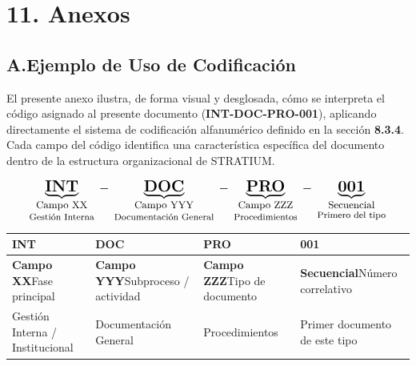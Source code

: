 \documentclass{encabezado}
\begin{document}
\section*{11. Anexos}

\subsection*{A.\enspace Ejemplo de Uso de Codificación}

El presente anexo ilustra, de forma visual y desglosada, cómo se interpreta el código asignado al presente documento (\textbf{INT-DOC-PRO-001}), aplicando directamente el sistema de codificación alfanumérico definido en la sección \textbf{8.3.4}. Cada campo del código identifica una característica específica del documento dentro de la estructura organizacional de STRATIUM.

\bigskip

\begin{center}
    \[
        \underbrace{\textbf{\Large INT}}_{\substack{\text{\small Campo XX}\\[2pt]\text{\footnotesize Gestión Interna}}}
        \;{\boldsymbol{-}}\;
        \underbrace{\textbf{\Large DOC}}_{\substack{\text{\small Campo YYY}\\[2pt]\text{\footnotesize Documentación General}}}
        \;{\boldsymbol{-}}\;
        \underbrace{\textbf{\Large PRO}}_{\substack{\text{\small Campo ZZZ}\\[2pt]\text{\footnotesize Procedimientos}}}
        \;{\boldsymbol{-}}\;
        \underbrace{\textbf{\Large 001}}_{\substack{\text{\small Secuencial}\\[2pt]\text{\footnotesize Primero del tipo}}}
    \]
\end{center}

\bigskip\bigskip

\begin{center}
    \footnotesize
    \renewcommand{\arraystretch}{1.8}
    \begin{tabular}{|>{\centering\arraybackslash}p{3cm}|>{\centering\arraybackslash}p{3cm}|>{\centering\arraybackslash}p{3cm}|>{\centering\arraybackslash}p{3cm}|}
        \hline
        \textbf{\large INT}                      & \textbf{\large DOC}                               & \textbf{\large PRO}                          & \textbf{\large 001}                            \\
        \hline
        \textbf{Campo XX}\newline Fase principal & \textbf{Campo YYY}\newline Subproceso / actividad & \textbf{Campo ZZZ}\newline Tipo de documento & \textbf{Secuencial}\newline Número correlativo \\
        \hline
        Gestión Interna / Institucional          & Documentación General                             & Procedimientos                               & Primer documento de este tipo                  \\
        \hline
    \end{tabular}
\end{center}
\end{document}
